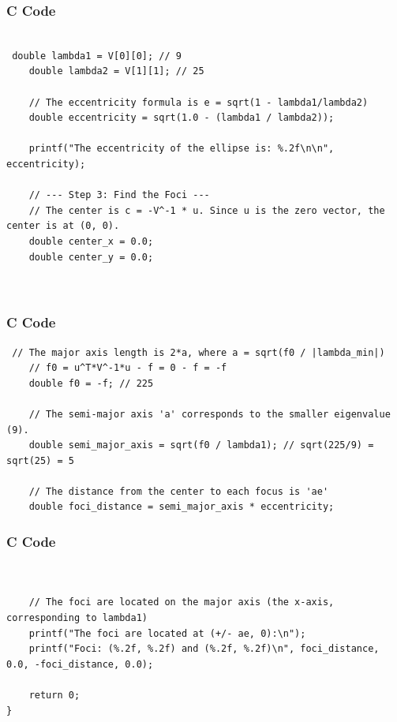 \documentclass{beamer}
\begin{document}
\begin{frame}[fragile]
    \frametitle{C Code }
    \begin{lstlisting}

 double lambda1 = V[0][0]; // 9
    double lambda2 = V[1][1]; // 25

    // The eccentricity formula is e = sqrt(1 - lambda1/lambda2)
    double eccentricity = sqrt(1.0 - (lambda1 / lambda2));

    printf("The eccentricity of the ellipse is: %.2f\n\n", eccentricity);

    // --- Step 3: Find the Foci ---
    // The center is c = -V^-1 * u. Since u is the zero vector, the center is at (0, 0).
    double center_x = 0.0;
    double center_y = 0.0;

   
        \end{lstlisting}
\end{frame}

\begin{frame}[fragile]
    \frametitle{C Code }
    \begin{lstlisting}
 // The major axis length is 2*a, where a = sqrt(f0 / |lambda_min|)
    // f0 = u^T*V^-1*u - f = 0 - f = -f
    double f0 = -f; // 225

    // The semi-major axis 'a' corresponds to the smaller eigenvalue (9).
    double semi_major_axis = sqrt(f0 / lambda1); // sqrt(225/9) = sqrt(25) = 5
    
    // The distance from the center to each focus is 'ae'
    double foci_distance = semi_major_axis * eccentricity;

        \end{lstlisting}
\end{frame}

\begin{frame}[fragile]
    \frametitle{C Code }
    \begin{lstlisting}


    // The foci are located on the major axis (the x-axis, corresponding to lambda1)
    printf("The foci are located at (+/- ae, 0):\n");
    printf("Foci: (%.2f, %.2f) and (%.2f, %.2f)\n", foci_distance, 0.0, -foci_distance, 0.0);

    return 0;
}

            \end{lstlisting}
\end{frame}
\end{document}
